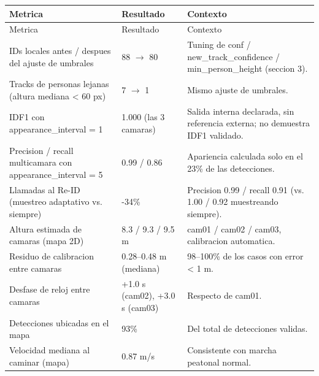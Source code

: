 \documentclass[12pt,letterpaper]{article}
\begin{document}
\begingroup\small\setlength{\tabcolsep}{4pt}\renewcommand{\arraystretch}{1.2}

\begin{longtable}{P{0.28\textwidth}P{0.22\textwidth}P{0.42\textwidth}}
\toprule

Metrica & Resultado & Contexto \\

\midrule
\endfirsthead
\toprule
Metrica & Resultado & Contexto \\
\midrule
\endhead

IDs locales antes / despues del ajuste de umbrales & 88 $\rightarrow$ 80 & Tuning de conf / new\_\allowbreak track\_\allowbreak confidence / min\_\allowbreak person\_\allowbreak height (seccion 3). \\

Tracks de personas lejanas (altura mediana < 60 px) & 7 $\rightarrow$ 1 & Mismo ajuste de umbrales. \\

IDF1 con appearance\_\allowbreak interval = 1 & 1.000 (las 3 camaras) & Salida interna declarada, sin referencia externa; no demuestra IDF1 validado. \\

Precision / recall multicamara con appearance\_\allowbreak interval = 5 & 0.99 / 0.86 & Apariencia calculada solo en el 23\% de las detecciones. \\

Llamadas al Re-ID (muestreo adaptativo vs. siempre) & -34\% & Precision 0.99 / recall 0.91 (vs. 1.00 / 0.92 muestreando siempre). \\

Altura estimada de camaras (mapa 2D) & 8.3 / 9.3 / 9.5 m & cam01 / cam02 / cam03, calibracion automatica. \\

Residuo de calibracion entre camaras & 0.28–0.48 m (mediana) & 98–100\% de los casos con error < 1 m. \\

Desfase de reloj entre camaras & +1.0 s (cam02), +3.0 s (cam03) & Respecto de cam01. \\

Detecciones ubicadas en el mapa & 93\% & Del total de detecciones validas. \\

Velocidad mediana al caminar (mapa) & 0.87 m/s & Consistente con marcha peatonal normal. \\

\bottomrule
\end{longtable}
\endgroup
\end{document}
